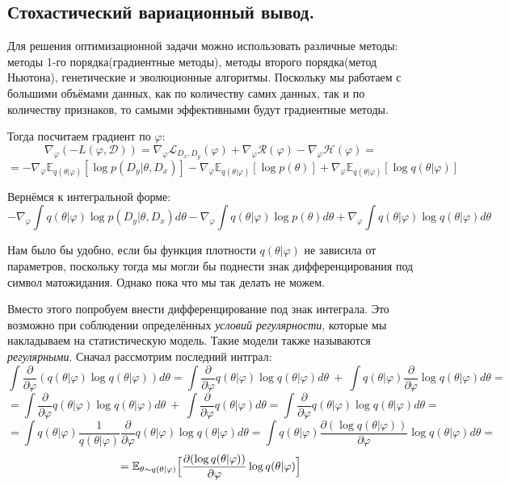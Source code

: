\subsection{Стохастический вариационный вывод.}

Для решения оптимизационной задачи можно использовать различные методы: методы 1-го порядка(градиентные методы), методы второго порядка(метод Ньютона), генетические и эволюционные алгоритмы. Поскольку мы работаем с большими объёмами данных,
 как по количеству самих данных, так и по количеству признаков, то самыми эффективными будут градиентные методы.

Тогда посчитаем градиент по $\varphi$:
$$\nabla_{\varphi} (-L(\varphi, \mathcal{D})) = \nabla_{\varphi} \mathcal{L}_{D_x, D_y}(\varphi) + \nabla_{\varphi} \mathcal{R}(\varphi) - \nabla_{\varphi} \mathcal{H}(\varphi)=$$
$$= -\nabla_{\varphi} \mathbb{E}_{q(\theta | \varphi)}[\log p(D_y | \theta, D_x)] - \nabla_{\varphi} \mathbb{E}_{q(\theta | \varphi)} [\log p(\theta)] +
\nabla_{\varphi} \mathbb{E}_{q(\theta | \varphi)} [\log q(\theta | \varphi)]$$

Вернёмся к интегральной форме:
$$-\nabla_{\varphi} \int q(\theta | \varphi) \log p(D_y | \theta, D_x) d\theta - \nabla_{\varphi} \int q(\theta | \varphi) \log p(\theta) d\theta + \nabla_{\varphi} \int q(\theta | \varphi) \log q(\theta | \varphi) d\theta$$

Нам было бы удобно, если бы функция плотности $q(\theta | \varphi)$ не зависила от параметров, поскольку тогда мы могли бы поднести знак дифференцирования под символ матожидания. Однако пока что мы так делать не можем.

Вместо этого попробуем внести дифференцирование под знак интеграла. Это возможно при соблюдении определённых \textit{условий регулярности}, которые мы накладываем на статистическую модель. Такие модели также называются
 \textit{регулярными}\cite{medvedev-stats}. Сначал рассмотрим последний интграл:
$$\int \frac{\partial}{\partial\varphi} (q(\theta | \varphi) \log q(\theta | \varphi)) d\theta = \int \frac{\partial}{\partial\varphi} q(\theta | \varphi) \log q(\theta | \varphi) d\theta\ +\ \int q(\theta | \varphi) \frac{\partial}{\partial\varphi} \log q(\theta | \varphi) d\theta =$$
$$=\int \frac{\partial}{\partial\varphi} q(\theta | \varphi) \log q(\theta | \varphi) d\theta\ +\ \int \frac{\partial}{\partial\varphi} q(\theta | \varphi) d\theta = \int \frac{\partial}{\partial\varphi} q(\theta | \varphi) \log q(\theta | \varphi) d\theta = $$
$$=\int q(\theta | \varphi) \frac{1}{q(\theta | \varphi)} \frac{\partial}{\partial\varphi} q(\theta | \varphi) \log q(\theta | \varphi) d\theta = \int q(\theta | \varphi) \frac{\partial(\log q(\theta | \varphi))}{\partial\varphi} \log q(\theta | \varphi) d\theta=$$
$$=\mathbb{E}_{\theta \sim q(\theta | \varphi)} \Bigl[\frac{\partial(\log q(\theta | \varphi))}{\partial\varphi} \log q(\theta | \varphi)\Bigr]$$

